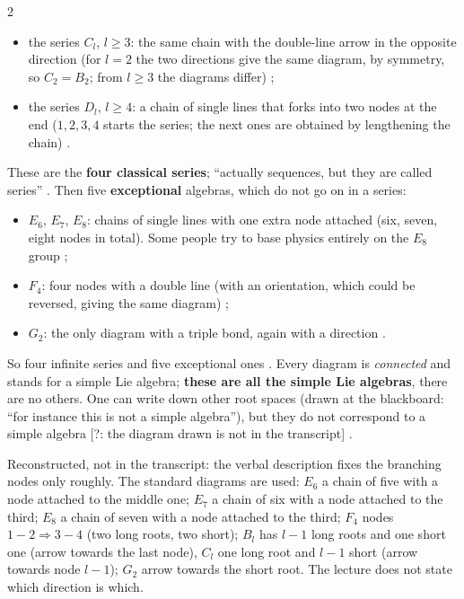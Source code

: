 \begin{paracol}{2}
\begin{itemize}
  \item the series \textbf{$C_l$}, $l\ge3$: the same chain with the double-line arrow in the opposite direction (for $l=2$ the two directions give the same diagram, by symmetry, so $C_2=B_2$; from $l\ge3$ the diagrams differ)  ;
  \item the series \textbf{$D_l$}, $l\ge4$: a chain of single lines that forks into two nodes at the end ($1,2,3,4$ starts the series; the next ones are obtained by lengthening the chain)  .
\end{itemize}
These are the \textbf{four classical series}; ``actually sequences, but they are called series'' . Then five \textbf{exceptional} algebras, which do not go on in a series:
\begin{itemize}
  \item $E_6$, $E_7$, $E_8$: chains of single lines with one extra node attached (six, seven, eight nodes in total). Some people try to base physics entirely on the $E_8$ group   ;
  \item $F_4$: four nodes with a double line (with an orientation, which could be reversed, giving the same diagram)  ;
  \item $G_2$: the only diagram with a triple bond, again with a direction .
\end{itemize}
So four infinite series and five exceptional ones . Every diagram is \emph{connected} and stands for a simple Lie algebra; \textbf{these are all the simple Lie algebras}, there are no others. One can write down other root spaces (drawn at the blackboard: ``for instance this is not a simple algebra''), but they do not correspond to a simple algebra [?: the diagram drawn is not in the transcript]  .
\begin{coursenote}
Reconstructed, not in the transcript: the verbal description fixes the branching nodes only roughly. The standard diagrams are used: $E_6$ a chain of five with a node attached to the middle one; $E_7$ a chain of six with a node attached to the third; $E_8$ a chain of seven with a node attached to the third; $F_4$ nodes $1\!-\!2\Rightarrow3\!-\!4$ (two long roots, two short); $B_l$ has $l-1$ long roots and one short one (arrow towards the last node), $C_l$ one long root and $l-1$ short (arrow towards node $l-1$); $G_2$ arrow towards the short root. The lecture does not state which direction is which. 

\end{coursenote}
\end{paracol}
